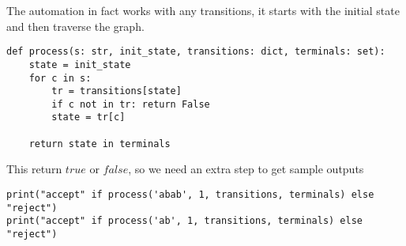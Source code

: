 \documentclass[12pt]{simple_doc}
\begin{document}
    The automation in fact works with any transitions, it starts with the initial state
    and then traverse the graph.
    \begin{verbatim}
def process(s: str, init_state, transitions: dict, terminals: set):
    state = init_state
    for c in s:
        tr = transitions[state]
        if c not in tr: return False
        state = tr[c]

    return state in terminals
    \end{verbatim}

    This return $true$ or $false$, so we need an extra step to get sample outputs
    \begin{verbatim}
print("accept" if process('abab', 1, transitions, terminals) else "reject")
print("accept" if process('ab', 1, transitions, terminals) else "reject")
    \end{verbatim}
\end{document}
